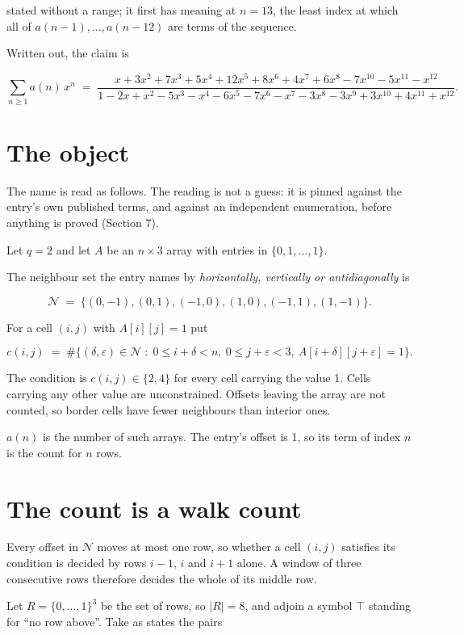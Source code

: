 \documentclass[11pt]{article}
\theoremstyle{definition}
\begin{document}
stated without a range; it first has meaning at $n = 13$, the least index at which all of $a(n-1),\dots,a(n-12)$ are terms of the sequence.

Written out, the claim is

\[\sum_{n \ge 1} a(n)\,x^n \;=\; \frac{x + 3x^{2} + 7x^{3} + 5x^{4} + 12x^{5} + 8x^{6} + 4x^{7} + 6x^{8} - 7x^{10} - 5x^{11} - x^{12}}{1 - 2x + x^{2} - 5x^{3} - x^{4} - 6x^{5} - 7x^{6} - x^{7} - 3x^{8} - 3x^{9} + 3x^{10} + 4x^{11} + x^{12}}.\]

\section{The object}

The name is read as follows. The reading is not a guess: it is pinned against the entry's own published terms, and against an independent enumeration, before anything is proved (Section 7).

Let $q = 2$ and let $A$ be an $n \times 3$ array with entries in $\{0,1,\dots,1\}$.

The neighbour set the entry names by {\itshape horizontally, vertically or antidiagonally} is

\[\mathcal{N} \;=\; \{(0,-1), (0,1), (-1,0), (1,0), (-1,1), (1,-1)\}.\]

For a cell $(i,j)$ with $A[i][j] = 1$ put

\[c(i,j) \;=\; \#\bigl\{(\delta,\varepsilon)\in\mathcal{N} \;:\; 0\le i+\delta<n,\ 0\le j+\varepsilon<3,\ A[i+\delta][j+\varepsilon] = 1\bigr\}.\]

The condition is $c(i,j) \in \{2, 4\}$ for every cell carrying the value 1. Cells carrying any other value are unconstrained. Offsets leaving the array are not counted, so border cells have fewer neighbours than interior ones.

$a(n)$ is the number of such arrays. The entry's offset is 1, so its term of index $n$ is the count for $n$ rows.

\section{The count is a walk count}

Every offset in $\mathcal{N}$ moves at most one row, so whether a cell $(i,j)$ satisfies its condition is decided by rows $i-1$, $i$ and $i+1$ alone. A window of three consecutive rows therefore decides the whole of its middle row.

Let $R = \{0,\dots,1\}^{3}$ be the set of rows, so $|R| = 8$, and adjoin a symbol $\top$ standing for ``no row above''. Take as states the pairs
\end{document}
